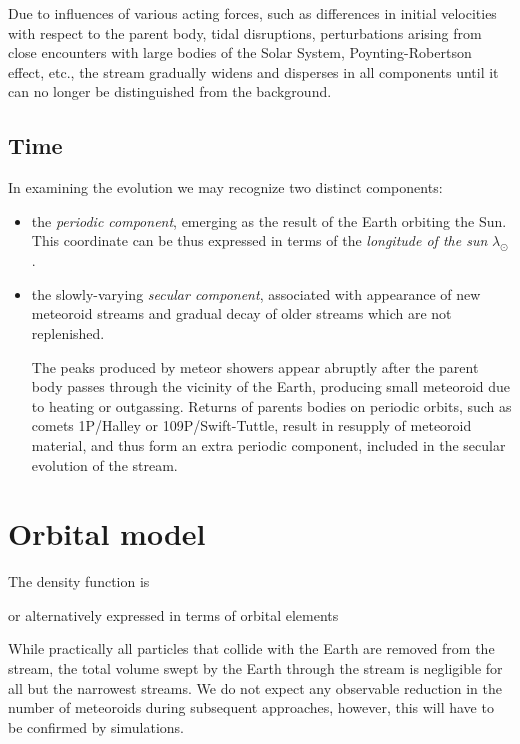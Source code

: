     Due to influences of various acting forces, such as differences
    in initial velocities with respect to the parent body, tidal disruptions,
    perturbations arising from close encounters with large bodies of the Solar System,
    Poynting-Robertson effect, etc., the stream
    gradually widens and disperses in all components until it can no longer be distinguished from the background.

    \subsection{Time} \label{i}
        In examining the evolution we may recognize two distinct components:
        \begin{itemize}
            \item the \emph{periodic component}, emerging as the result of the Earth orbiting the Sun.
                This coordinate can be thus expressed in terms of the \emph{longitude of the sun} $\lambda_\odot$.

            \item the slowly-varying \emph{secular component}, associated with appearance of new meteoroid streams and gradual decay of older
                streams which are not replenished.

                The peaks produced by meteor showers appear abruptly after the parent body passes through the vicinity of the Earth,
                producing small meteoroid due to heating or outgassing.
                Returns of parents bodies on periodic orbits, such as comets 1P/Halley or 109P/Swift-Tuttle, result
                in resupply of meteoroid material, and thus form an extra periodic component, included in the secular evolution of the stream.

        \end{itemize}


\section{Orbital model} \label{po}

  


    The density function is 
    \eqn{eq:po-rv}{
        \varrho(\vec{r}, \vec{v}, t) \in \left[0, \infty\right).
    }

    or alternatively expressed in terms of orbital elements


    While practically all particles that collide with the Earth are removed from the stream,
    the total volume swept by the Earth through the stream is negligible for all but the narrowest streams.
    We do not expect any observable reduction in the number of meteoroids during subsequent approaches,
    however, this will have to be confirmed by simulations.


